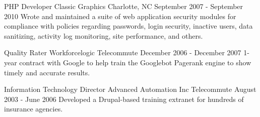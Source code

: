 \begin{cventries}

\cventry
{PHP Developer}
{Classic Graphics} %
{Charlotte, NC} %
{September 2007 - September 2010} %
{
Wrote and maintained a suite of web application security modules for compliance with policies regarding passwords, login security, inactive users, data sanitizing, activity log monitoring, site performance, and others.
}

\cventry
{Quality Rater}
{Workforcelogic}
{Telecommute}
{December 2006 - December 2007} %
{ %
1-year contract with Google to help train the Googlebot Pagerank engine to show timely and accurate results.
}


\cventry
{Information Technology Director}
{Advanced Automation Inc}
{Telecommute}
{August 2003 - June 2006} %
{ %
Developed a Drupal-based training extranet for hundreds of insurance agencies.
}


\end{cventries}
